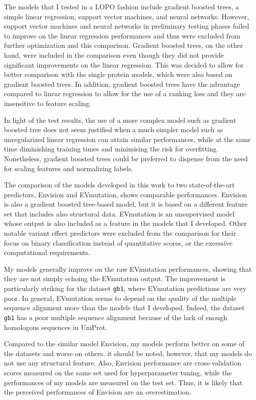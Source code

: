 The models that I tested in a LOPO fashion include gradient boosted trees, a simple linear regression, support vector machines, and neural networks.
However, support vector machines and neural networks in preliminary testing phases failed to improve on the linear regression performances and thus were excluded from further optimization and this comparison.
Gradient boosted trees, on the other hand, were included in the comparison even though they did not provide significant improvements on the linear regression.
This was decided to allow for better comparison with the single protein models, which were also based on gradient boosted trees.
In addition, gradient boosted trees have the advantage compared to linear regression to allow for the use of a ranking loss and they are insensitive to feature scaling.

In light of the test results, the use of a more complex model such as gradient boosted tree does not seem justified when a much simpler model such as unregularized linear regression can attain similar performances, while at the same time diminishing training times and minimising the risk for overfitting.
Nonetheless, gradient boosted trees could be preferred to dispense from the need for scaling features and normalizing labels.

The comparison of the models developed in this work to two state-of-the-art predictors, Envision and EVmutation, shows comparable performances.
Envision is also a gradient boosted tree-based model, but it is based on a different feature set that includes also structural data.
EVmutation is an unsupervised model whose output is also included as a feature in the models that I developed.
Other notable variant effect predictors were excluded from the comparison for their focus on binary classification instead of quantitative scores, or the excessive computational requirements.

My models generally improve on the raw EVmutation performances, showing that they are not simply echoing the EVmutation output.
The improvement is particularly striking for the dataset \texttt{gb1}, where EVmutation predictions are very poor.
In general, EVmutation seems to depend on the quality of the multiple sequence alignment more than the models that I developed.
Indeed, the dataset \texttt{gb1} has a poor multiple sequence alignment because of the lack of enough homologous sequences in UniProt.

Compared to the similar model Envision, my models perform better on some of the datasets and worse on others.
it should be noted, however, that my models do not use any structural feature.
Also, Envision performance are cross-validation scores measured on the same set used for hyperparameter tuning, while the performances of my models are measured on the test set.
Thus, it is likely that the perceived performances of Envision are an overestimation.

